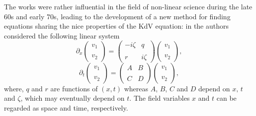 \documentclass{cimart}
\newcommand{\bb}{\begin{equation}}
\newcommand{\ee}{\end{equation}}
\begin{document}
The works \cite{gardprl,miura,zab} were rather influential in the field of non-linear science during the late 60s and early 70s, leading to the development of a new method for finding equations sharing the nice properties of the KdV equation: in \cite{akns} the authors considered the following linear system
\bb\label{1.0.1}
\partial_x\begin{pmatrix}
v_1\\
\\
v_2
\end{pmatrix}=
\begin{pmatrix}
-i\zeta& q\\
\\
r& i\zeta
\end{pmatrix}
\begin{pmatrix}
v_1\\
\\
v_2
\end{pmatrix},
\ee
\bb\label{1.0.2}
\partial_t\begin{pmatrix}
v_1\\
\\
v_2
\end{pmatrix}=
\begin{pmatrix}
A& B\\
\\
C& D
\end{pmatrix}
\begin{pmatrix}
v_1\\
\\
v_2
\end{pmatrix},
\ee
where, $q$ and $r$ are functions of $(x,t)$ whereas $A$, $B$, $C$ and $D$ depend on $x,\,t$ and $\zeta$, which may eventually depend on $t$. The field variables $x$ and $t$ can be regarded as space and time, respectively.
\end{document}
